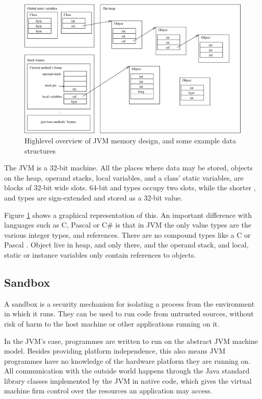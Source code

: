 \begin{figure}
\centering
\includegraphics[width=\linewidth]{jvmmemory.eps}
\caption[Highlevel overview of JVM memory design]{Highlevel overview of JVM memory design, and some example data structures}
\label{fig-jvm-memory}
\end{figure}

The JVM is a 32-bit machine. All the places where data may be stored, objects on the heap, operand stacks, local variables, and a class' static variables, are blocks of 32-bit wide slots. 64-bit  and  types occupy two slots, while the shorter , and  types are sign-extended and stored as a 32-bit value.
  
Figure \ref{fig-jvm-memory} shows a graphical representation of this. An important difference with languages such as C, Pascal or C\# is that in JVM the only value types are the various integer types, and references. There are no compound types like a C  or Pascal . Object live in heap, and only there, and the operand stack, and local, static or instance variables only contain references to objects.

\subsection{Sandbox}
A sandbox is a security mechanism for isolating a process from the environment in which it runs. They can be used to run code from untrusted sources, without risk of harm to the host machine or other applications running on it.

In the JVM's case, programmes are written to run on the abstract JVM machine model. Besides providing platform independence, this also means JVM programmes have no knowledge of the hardware platform they are running on. All communication with the outside world happens through the Java standard library classes implemented by the JVM in native code, which gives the virtual machine firm control over the resources an application may access.

